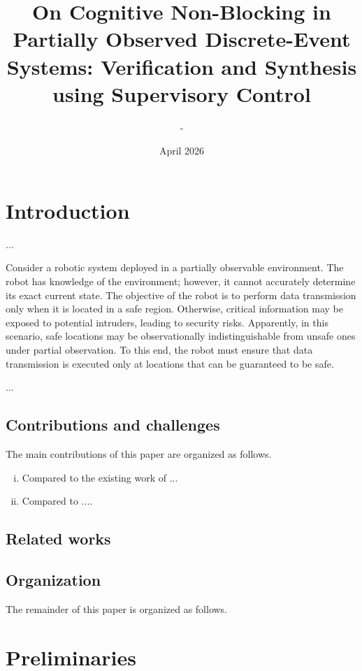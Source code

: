 \documentclass{article}
\title{On Cognitive Non-Blocking in Partially Observed Discrete-Event Systems:
Verification and Synthesis using Supervisory Control}
\author{-}
\date{April 2026}
\begin{document}
\maketitle

\section{Introduction}

...

Consider a robotic system deployed in a partially observable environment. The robot has knowledge of the environment; however, it cannot accurately determine its exact current state. 
The objective of the robot is to perform data transmission only when it is located in a safe region. 
Otherwise, critical information may be exposed to potential intruders, leading to security risks.
%
Apparently, in this scenario, safe locations may be observationally indistinguishable from unsafe ones under partial observation. 
To this end, the robot must ensure that data transmission is executed only at locations that can be guaranteed to be safe.

...

\subsection{Contributions and challenges}

The main contributions of this paper are organized as follows.
%
\begin{enumerate}[(i)]
    \item Compared to the existing work of ...

    \item Compared to ....
\end{enumerate}

\subsection{Related works}

\subsection{Organization}

The remainder of this paper is organized as follows.

\section{Preliminaries}\label{sec:prelimi}
\end{document}

